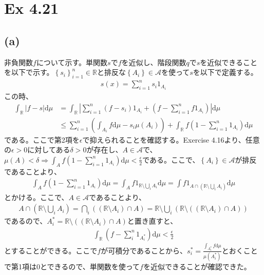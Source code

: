 \documentclass{article}
\begin{document}
\section{Ex 4.21}
\subsection{(a)}
非負関数$f$について示す。単関数$s$で$f$を近似し、階段関数$q$で$s$を近似できることを以下で示す。$\left\{ s_i \right\}_{i = 1}^n \in \mathbb{R}$と排反な$\left\{ A_i \right\} \in \mathcal{A}$を使って$s$を以下で定義する。
\begin{align*}
	s(x) = \sum_{i = 1}^n s_i 1_{A_i}
\end{align*}
この時、
\begin{align*}
	\int_{\mathbb{R}} |f-s| \mathrm{d}\mu &= \int_{\mathbb{R}}\left| \sum_{i = 1}^n (f-s_i)1_{A_i} + \left(f- \sum_{i = 1}^n f1_{A_i} \right) \right| \mathrm{d}\mu\\
	&\leq \sum_{i = 1}^n \left( \int_{A_i} f\mathrm{d}\mu - s_i \mu(A_i) \right) + \int_{\mathbb{R}} f\left( 1 - \sum_{i=1}^n 1_{A_i} \right) \mathrm{d}\mu
\end{align*}
である。ここで第2項を$\epsilon$で抑えられることを確認する。Exercise 4.16より、任意の$\epsilon > 0$に対してある$\delta > 0$が存在し、$A\in \mathcal{A}$で、$\mu(A) < \delta \Rightarrow \int_A f \left( 1 - \sum_{i=1}^n 1_{A_i} \right) \mathrm{d}\mu < \frac{\epsilon}{2}$である。ここで、$\left\{ A_i \right\} \in \mathcal{A}$が排反であることより、
\begin{align*}
	\int_A f \left( 1 - \sum_{i=1}^n 1_{A_i} \right) \mathrm{d}\mu = \int_A f1_{\mathbb{R}\setminus \bigcup_i A_i} \mathrm{d}\mu = \int f1_{A \cap \left( \mathbb{R}\setminus \bigcup_i A_i \right)} \mathrm{d}\mu
\end{align*}
とかける。ここで、$A \in \mathcal{A}$であることより、
\begin{align*}
	A \cap \left( \mathbb{R}\setminus \bigcup_i A_i \right) = \bigcap_i \left( (\mathbb{R} \setminus A_i) \cap A \right) = \mathbb{R} \setminus \bigcup_i \left( \mathbb{R}\setminus \left( (\mathbb{R} \setminus A_i) \cap A \right) \right)
\end{align*}
であるので、$A_i^{*} = \mathbb{R}\setminus \left( (\mathbb{R} \setminus A_i) \cap A \right)$と置き直すと、
\begin{align*}
	\int_{\mathbb{R}} \left( f - \sum_i^n 1_{A_i^{*}} \right) \mathrm{d}\mu < \frac{\epsilon}{2}
\end{align*}
とすることができる。ここで$f$が可積分であることから、$s_i^{*} = \frac{\int_{A_i^{*}} f\mathrm{d}\mu}{\mu(A_i^{*})}$とおくことで第1項は$0$とできるので、単関数を使って$f$を近似できることが確認できた。
\end{document}

